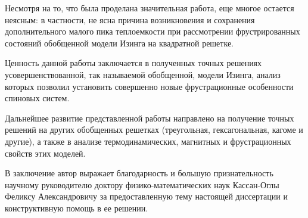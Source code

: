 Несмотря на то, что была проделана значительная работа, еще многое остается неясным: в частности, не ясна причина возникновения и сохранения дополнительного малого пика теплоемкости при рассмотрении фрустрированных состояний обобщенной модели Изинга на квадратной решетке.

Ценность данной работы заключается в полученных точных решениях усовершенствованной, так называемой обобщенной, модели Изинга, анализ которых позволил установить совершенно новые фрустрационные особенности спиновых систем.

Дальнейшее развитие представленной работы направлено на получение точных решений на других обобщенных решетках (треугольная, гексагональная, кагоме и другие), а также в анализе термодинамических, магнитных и фрустрационных свойств этих моделей.

В заключение автор выражает благодарность и большую признательность научному руководителю доктору физико-математических наук Кассан-Оглы Феликсу Александровичу за предоставленную тему настоящей диссертации и конструктивную помощь в ее решении. 
